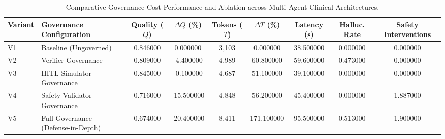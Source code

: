 \begin{table}
\caption{Comparative Governance-Cost Performance and Ablation across Multi-Agent Clinical Architectures.}
\label{tab:variant_summary}
\begin{tabular}{llccccccc}
\toprule
Variant & Governance Configuration & Quality ($Q$) & $\Delta Q$ (\%) & Tokens ($T$) & $\Delta T$ (\%) & Latency (s) & Halluc. Rate & Safety Interventions \\
\midrule
V1 & Baseline (Ungoverned) & 0.846000 & 0.000000 & 3,103 & 0.000000 & 38.500000 & 0.000000 & 0.000000 \\
V2 & Verifier Governance & 0.809000 & -4.400000 & 4,989 & 60.800000 & 59.600000 & 0.473000 & 0.000000 \\
V3 & HITL Simulator Governance & 0.845000 & -0.100000 & 4,687 & 51.100000 & 39.100000 & 0.000000 & 0.000000 \\
V4 & Safety Validator Governance & 0.716000 & -15.500000 & 4,848 & 56.200000 & 45.400000 & 0.000000 & 1.887000 \\
V5 & Full Governance (Defense-in-Depth) & 0.674000 & -20.400000 & 8,411 & 171.100000 & 95.500000 & 0.513000 & 1.900000 \\
\bottomrule
\end{tabular}
\end{table}
